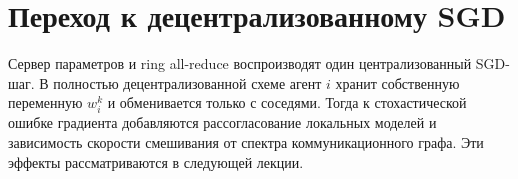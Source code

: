 \section{Переход к децентрализованному SGD}

Сервер параметров и ring all-reduce воспроизводят один
централизованный SGD-шаг. В полностью децентрализованной схеме агент
\(i\) хранит собственную переменную \(w_i^k\) и обменивается только с
соседями. Тогда к стохастической ошибке градиента добавляются
рассогласование локальных моделей и зависимость скорости смешивания
от спектра коммуникационного графа. Эти эффекты рассматриваются в
следующей лекции.
